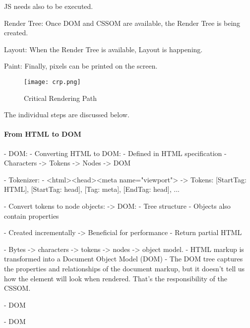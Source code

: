JS needs also to be executed.

Render Tree: Once DOM and CSSOM are available, the Render Tree is being created.

Layout: When the Render Tree is available, Layout is happening.

Paint: Finally, pixels can be printed on the screen.

\begin{figure}[h!]
\begin{center}
\texttt{[image: crp.png]}
\caption{Critical Rendering Path}
\label{img:crp}
\end{center}
\end{figure}

The individual steps are discussed below.





\paragraph{From HTML to DOM}




- DOM:
	- Converting HTML to DOM:
		- Defined in HTML specification
		- Characters -> Tokens -> Nodes -> DOM

	- Tokenizer:
		- <html><head><meta name="viewport">
		-> Tokens: [StartTag: HTML], [StartTag: head], [Tag: meta], [EndTag: head], ...

	- Convert tokens to node objects:
		-> DOM:
			- Tree structure
			- Objects also contain properties

		- Created incrementally
		-> Beneficial for performance
		- Return partial HTML


- Bytes -> characters -> tokens -> nodes -> object model.
- HTML markup is transformed into a Document Object Model (DOM)
- The DOM tree captures the properties and relationships of the document markup, but it doesn't tell us how the element will look when rendered. That’s the responsibility of the CSSOM.

- DOM


- DOM




